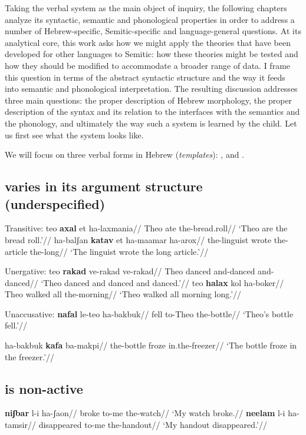 Taking the verbal system as the main object of inquiry, the following chapters analyze its syntactic, semantic and phonological properties in order to address a number of Hebrew-specific, Semitic-specific and language-general questions. At its analytical core, this work asks how we might apply the theories that have been developed for other languages to Semitic: how these theories might be tested and how they should be modified to accommodate a broader range of data. I frame this question in terms of the abstract syntactic structure and the way it feeds into semantic and phonological interpretation. The resulting discussion addresses three main questions: the proper description of Hebrew morphology, the proper description of the syntax and its relation to the interfaces with the semantics and the phonology, and ultimately the way such a system is learned by the child. Let us first see what the system looks like.



We will focus on three verbal forms in Hebrew (\emph{templates}): {\tkal}, {\tnif} and {\thif}.

	\subsection{{\tkal} varies in its argument structure (underspecified)}
\pex Transitive:
	\a \begingl
		\gla teo \textbf{axal} et ha-laxmania//
		\glb Theo ate  the-bread.roll//
		\glft `Theo are the bread roll.'//
	\endgl
	\a \begingl
		\gla ha-balʃan \textbf{katav} et ha-maamar ha-arox//
		\glb the-linguist wrote  the-article the-long//
		\glft `The linguist wrote the long article.'//
	\endgl
\xe

\pex Unergative:
	\a \begingl
		\gla teo \textbf{rakad} ve-rakad ve-rakad//
		\glb Theo danced and-danced and-danced//
		\glft `Theo danced and danced and danced.'//
	\endgl
	\a \begingl
		\gla teo \textbf{halax} kol ha-boker//
		\glb Theo walked all the-morning//
		\glft `Theo walked all morning long.'//
	\endgl
\xe

\pex Unaccusative:
	\a \begingl
		\gla \textbf{nafal} le-teo ha-bakbuk//
		\glb fell to-Theo the-bottle//
		\glft `Theo's bottle fell.'//
	\endgl
	
	\a \begingl
		\gla ha-bakbuk \textbf{kafa} ba-makpi//
		\glb the-bottle froze in.the-freezer//
		\glft `The bottle froze in the freezer.'//
	\endgl
\xe


	\subsection{{\tnif} is non-active}
\pex
	\a \begingl
		\gla \textbf{niʃbar} l-i ha-ʃaon//
		\glb broke to-me the-watch//
		\glft `My watch broke.//
	\endgl
	\a \begingl
		\gla \textbf{neelam} l-i ha-tamsir//
		\glb disappeared to-me the-handout//
		\glft `My handout disappeared.'//
	\endgl
\xe


